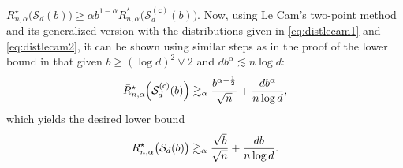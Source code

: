 \documentclass[a4paper,onecolumn,11pt,accepted=2026-05-12]{quantumarticle}
\newcommand{\cS}{\mathcal{S}}
\begin{document}
$R_{n,\alpha}^{\star}\big(\cS_d(b)\big) \geq \alpha b^{1-\alpha} \bar R_{n,\alpha}^{\star}\big(\cS_d^{(\mathsf{c})}(b)\big)$. Now, using Le Cam's two-point method and its generalized version with the distributions given in \eqref{eq:distlecam1} and \eqref{eq:distlecam2}, it can be shown using similar steps as in the proof of the lower bound in \cite[Theorem 1]{Yanjun-2020-alphadiv} that given $b \geq (\log d)^2 \vee 2$ and $db^{\alpha} \lesssim n \log d$:
\begin{align}
    \bar R_{n,\alpha}^{\star}\mspace{-4 mu}\left(\cS_d^{(\mathsf{c})}(b)\right) \gtrsim_{\alpha} \frac{b^{\alpha-\frac 12}}{\sqrt{n}}+\frac{db^{\alpha}}{n \log d}, \notag 
\end{align}
which yields the desired lower bound
\begin{align}
 R_{n,\alpha}^{\star}\big(\cS_d(b)\big) \gtrsim_{\alpha} \frac{\sqrt{b}}{\sqrt{n}}+\frac{db}{n \log d}. \notag 
\end{align}
\end{document}

